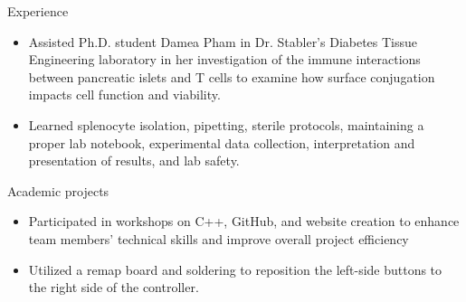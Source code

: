 \documentclass{resume} %
\begin{document}
\begin{workSection}{Experience}
    \experienceItem[
        company=J. Crayton Pruitt Family Department of Biomedical Engineering,
        position=Undergraduate Research Internship Program,
        duration=May 2023 – July 2023
    ]
     \begin{itemize}
        \itemsep -6pt {} 
        \item  Assisted Ph.D. student Damea Pham in Dr. Stabler’s Diabetes Tissue Engineering laboratory in her investigation of the immune interactions between pancreatic islets and T cells to examine how surface conjugation impacts cell function and viability.
        \item Learned splenocyte isolation, pipetting, sterile protocols, maintaining a proper lab notebook, experimental data collection, interpretation and presentation of results, and lab safety.
     \end{itemize}
     
     
\end{workSection}

\begin{workSection}{Academic projects}
     \customItem[
        title=Aerospace Team Research - Society of Women Engineers,
        duration=Fall 2022 – Spring 2023,
        keyHighlight=Collaborated in a team of five to gather satellite data to inform the design of aerospace technologies
     ]
     \begin{itemize}
        \vspace{-0.5em}
        \itemsep -6pt {} 
        \item Participated in workshops on C++{,} GitHub{,} and website creation to enhance team members' technical skills and improve overall project efficiency
     \end{itemize}

     \customItem[
        title=PlayStation 5 Controller Accessibility - Generalized Relief in Prosthetics,
        duration=Spring 2019,
        keyHighlight=Contributed to a CAD subteam focused on designing an accessible PlayStation controller.
     ]
     \begin{itemize}
        \vspace{-0.5em}
        \itemsep -6pt {} 
        \item Utilized a remap board and soldering to reposition the left-side buttons to the right side of the controller.
     \end{itemize}
\end{workSection}
\end{document}
